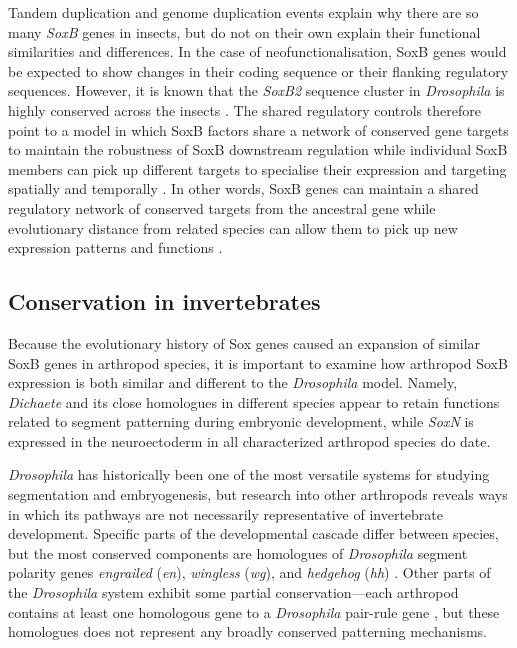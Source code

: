 \documentclass[withindex,glossary]{cam-thesis}
\begin{document}
Tandem duplication and genome duplication events explain why there are
so many \emph{SoxB} genes in insects, but do not on their own explain
their functional similarities and differences. In the case of
neofunctionalisation, SoxB genes would be expected to show changes in
their coding sequence or their flanking regulatory sequences. However,
it is known that the \emph{SoxB2} sequence cluster in \emph{Drosophila}
is highly conserved across the insects . The
shared regulatory controls therefore point to a model in which SoxB
factors share a network of conserved gene targets to maintain the
robustness of SoxB downstream regulation while individual SoxB members
can pick up different targets to specialise their expression and
targeting spatially and temporally . In other words, SoxB genes can maintain a shared
regulatory network of conserved targets from the ancestral gene  while
evolutionary distance from related species can allow them to pick up new
expression patterns and functions .

\subsection{Conservation in invertebrates}

Because the evolutionary history of Sox genes caused an expansion of
similar SoxB genes in arthropod species, it is important to examine how
arthropod SoxB expression is both similar and different to the
\emph{Drosophila} model. Namely, \emph{Dichaete} and its close
homologues in different species appear to retain functions related to
segment patterning during embryonic development, while \emph{SoxN} is
expressed in the neuroectoderm in all characterized arthropod species do
date.

\emph{Drosophila} has historically been one of the most versatile
systems for studying segmentation and embryogenesis, but research into
other arthropods reveals ways in which its pathways are not necessarily
representative of invertebrate development. Specific parts of the
developmental cascade differ between species, but the most conserved
components are homologues of \emph{Drosophila} segment polarity genes
\emph{engrailed} (\emph{en}), \emph{wingless} (\emph{wg}), and
\emph{hedgehog} (\emph{hh}) . Other parts of the
\emph{Drosophila} system exhibit some partial conservation---each
arthropod contains at least one homologous gene to a \emph{Drosophila}
pair-rule gene , but these homologues does not
represent any broadly conserved patterning mechanisms.
\end{document}
